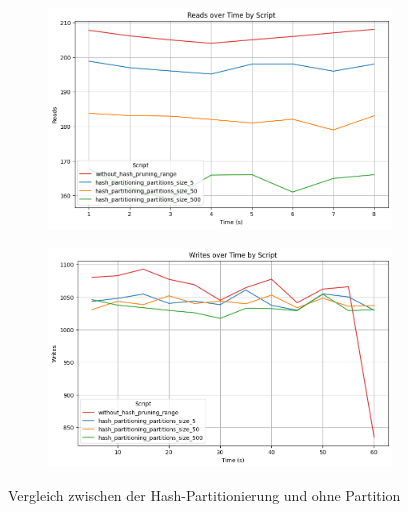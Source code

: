 \vspace{-8pt}
\begin{figure}[H]
	\centering
	\begin{subfigure}[t]{0.48\textwidth}
		\includegraphics[width=\textwidth]{PNGs/Script/Partition/hash-partition/Reads}
	\end{subfigure}
	\hfill
	\begin{subfigure}[t]{0.48\textwidth}
		\includegraphics[width=\textwidth]{PNGs/Script/Partition/hash-partition/Writes}
	\end{subfigure}
	\vspace{-8pt}
	\caption[Hash-Partitionierung: Variationen der Partitionsanzahl]{Vergleich zwischen der Hash-Partitionierung und ohne Partition}
	\label{fig:hash-partition}
\end{figure}
\vspace{-12pt}